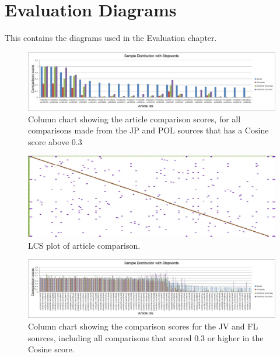 \chapter{Evaluation Diagrams}
This contains the diagrams used in the Evaluation chapter.

\begin{figure}
	\centering
	\includegraphics[scale=0.45]{figures/JPPOLScoreGraph}
	\caption{Column chart showing the article comparison scores, for all comparisons made from the JP and POL sources that has a Cosine score above 0.3}
	\label{D1}
\end{figure}

\begin{figure}
	\centering
	\includegraphics[scale=0.5]{figures/e410559e}
	\caption{LCS plot of article comparison.}
	\label{D2}
\end{figure}

\begin{figure}
	\centering
	\includegraphics[scale=0.45]{figures/JV-LemvigScoreGraph}
	\caption{Column chart showing the comparison scores for the JV and FL sources, including all comparisons that scored 0.3 or higher in the Cosine score.}
	\label{D3}
\end{figure}
